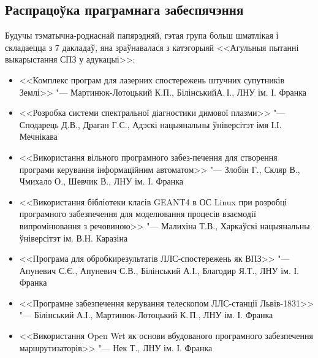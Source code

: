 \documentclass[10pt, a5paper]{article}
\begin{document}
\subsection*{Распрацоўка праграмнага забеспячэння}
Будучы тэматычна-роднаснай папярэдняй, гэтая група больш шматлікая і складаецца з 7 дакладаў, яна зраўнавалася з катэгорыяй <<Агульныя пытанні выкарыстання СПЗ у адукацыі>>:
\begin{itemize}
\item <<Комплекс програм для лазерних спостережень штучних супутників Землі>> "--- Мартинюк-Лотоцький К.П., Білінський\linebreak А.\,І., ЛНУ ім. І. Франка
\item <<Розробка системи спектральної діагностики димової плазми>> "--- Сподарець Д.В., Драган Г.С., Адэскі нацыянальны ўні\-версітэт імя І.І. Мечнікава
\item <<Використання вільного програмного забез-печення для створення програми керування інформаційним автоматом>> "--- Зло\-бін Г., Скляр В., Чмихало О., Шевчик В., ЛНУ ім. І. Франка
\item <<Використання бібліотеки класів GEANT4 в ОС Linux при розробці програмного забезпечення для моделювання процесів взаємодії випромінювання з речовиною>> "--- Малихіна Т.В., \linebreak Харкаўскі нацыянальны ўніверсітэт ім. В.Н. Каразіна
\item  <<Програма для обробкирезультатів ЛЛС-спостережень як \linebreak ВПЗ>> "--- Апуневич С.Є., Апуневич С.В., Білінський А.І., Благодир Я.Т., ЛНУ ім. І. Франка
\item  <<Програмне забезпечення керування телескопом  ЛЛС-станції Львів-1831>> "--- Білінський А.І., Мартинюк-Лотоцький К.\,П., \linebreak ЛНУ ім. І. Франка
\item <<Використання Open Wrt як основи вбудованого програмного забезпечення маршрутизаторів>> "--- Нек Т., ЛНУ ім. І. Франка
\end{itemize}
\end{document}
